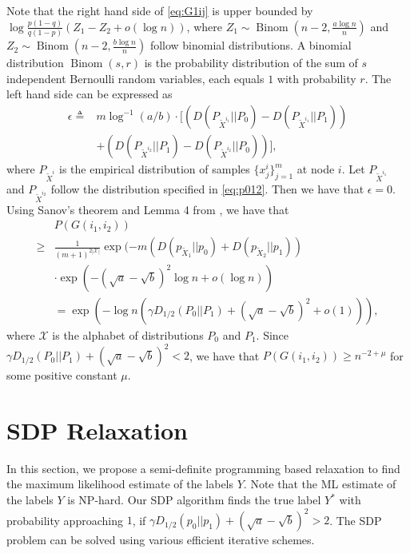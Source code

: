 \documentclass[conference]{IEEEtran}
\DeclareMathOperator{\Binom}{Binom}
\begin{document}
		Note that the right hand side of \eqref{eq:G1ij} is upper bounded by $\log \frac{p(1-q)}{q(1-p)}(Z_1-Z_2+o(\log n))$, where $Z_1\sim \Binom(n-2,\frac{a\log n}{n})$ and $Z_2\sim \Binom(n-2,\frac{b\log n}{n})$ 
		follow binomial distributions. A binomial distribution $\Binom(s,r)$ is the probability distribution of the sum of $s$ independent Bernoulli random variables, each equals $1$ with probability $r$.
		The left hand side can be expressed as
		\begin{align*}
			\epsilon\triangleq&m\log^{-1}( a /b)\cdot [(D(P_{\widetilde{X}^{i_1}} || P_0) - D(P_{\widetilde{X}^{i_1}} || P_1)) \\
			&+(D(P_{\widetilde{X}^{i_2}} || P_1) - D(P_{\widetilde{X}^{i_2}} || P_0))],
		\end{align*}
		where $P_{\widetilde{X}^i}$ is the empirical distribution of samples $\{x^i_j\}^m_{j=1}$ at node $i$. Let $P_{\widetilde{X}^{i_1}}$ and $P_{\widetilde{X}^{i_2}}$ follow the distribution specified in \eqref{eq:p012}. Then we have that $\epsilon =0$. Using Sanov's theorem and Lemma 4 from \cite{abbe2015exact}, we have that
		\begin{align*}
			&P(G(i_1,i_2))\\
			\geq &\frac{1}{(m+1)^{2|\mathcal{X}|}} \exp(-m(D(p_{\widetilde{X}_1} || p_0) + D(p_{\widetilde{X}_2} || p_1)) \\
			&\cdot\exp(- (\sqrt{a} - \sqrt{b})^2\log n+o(\log n) ) \\
			& = \exp(-\log n (\gamma D_{1/2}(P_0||P_1) + (\sqrt{a} - \sqrt{b})^2+ o(1))),
		\end{align*}
		where $\mathcal{X}$ is the alphabet of distributions $P_0$ and $P_1$.
		Since $\gamma D_{1/2}(P_0||P_1) + (\sqrt{a} - \sqrt{b})^2<2$, we have that $P(G(i_1,i_2))\ge n^{-2+\mu}$ for some positive constant $\mu$.
	

	
	\section{SDP Relaxation}\label{s:sdp}
	In this section, we propose a semi-definite programming based relaxation to find the maximum likelihood estimate of the labels $Y$. Note that
	the ML estimate of the labels $Y$ is NP-hard. 
	Our SDP algorithm finds the true label $Y^*$ with probability approaching $1$, if
	$\gamma D_{1/2}(p_0||p_1) + (\sqrt{a} - \sqrt{b})^2 > 2$.
	The SDP problem can be solved using various efficient iterative schemes.
	
\end{document}
